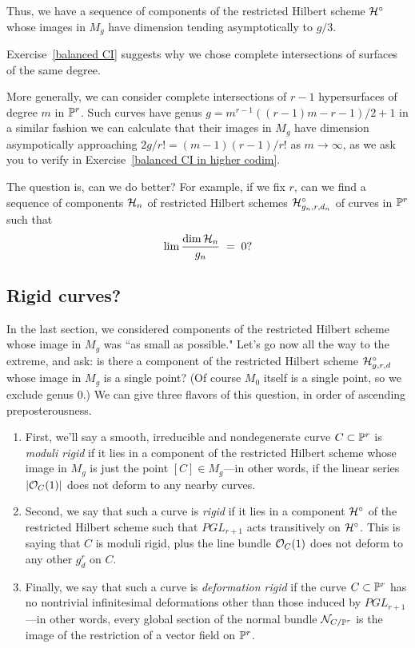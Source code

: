 Thus, we have a sequence of components of the restricted Hilbert scheme $\cH^\circ$ whose images in $M_g$ have dimension tending asymptotically to $g/3$.

Exercise~\ref{balanced CI}  suggests why we chose complete intersections of surfaces of the same degree.


More generally, we can consider complete intersections of $r-1$ hypersurfaces of degree $m$ in $\PP^r$. Such curves have
genus $g = m^{r-1}((r-1)m-r-1)/2 +1$ in a similar fashion we can calculate that their images in $M_g$ have dimension asympotically approaching $2g/r!= (m-1)(r-1)/r!$
 as $m \to \infty$, as we ask you to verify in Exercise~\ref{balanced CI in higher codim}.


The question is, can we do better? For example, if we fix $r$, can we find a sequence of components $\cH_n$ of  restricted Hilbert schemes  $\cH^\circ_{g_n,r,d_n}$ of curves in $\PP^r$ such that
$$
\lim \frac{\dim \cH_n}{g_n} \; = \; 0?
$$

\subsection{Rigid curves?}

In the last section, we considered components of the restricted Hilbert scheme whose image in $M_g$ was ``as small as possible." Let's go now all the way to the extreme, and ask: is there a component of the restricted Hilbert scheme $\cH^\circ_{g,r,d}$ whose image in $M_g$ is a single point? (Of course $M_0$ itself is a single point, so we exclude genus 0.) We can give three flavors of this question, in order of ascending preposterousness.

\begin{enumerate} 
\item First, we'll say a smooth, irreducible and nondegenerate curve $C \subset \PP^r$ is \emph{moduli rigid} if it lies in a component of the restricted Hilbert scheme whose image in $M_g$ is just the point $[C] \in M_g$---in other words, if the linear series $|\cO_C(1)|$ does not deform to any nearby curves.

\item Second, we say that such a curve is \emph{rigid} if it lies in a component $\cH^\circ$ of the restricted Hilbert scheme such that $PGL_{r+1}$ acts transitively on $\cH^\circ$. This is saying that $C$ is moduli rigid, plus the line bundle $\cO_C(1)$ does not deform to any other $g^r_d$ on $C$.

\item Finally, we say that such a curve is \emph{deformation rigid} if the curve $C \subset \PP^r$ has no nontrivial infinitesimal deformations other than those induced by $PGL_{r+1}$---in other words, every global section of the normal bundle $\cN_{C/\PP^r}$ is the image of the restriction of a vector field on $\PP^r$.
\end{enumerate}


